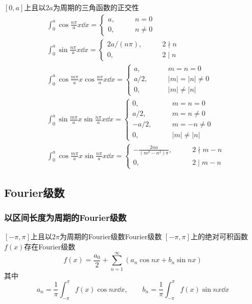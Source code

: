 \documentclass[lang = cn, scheme = chinese, thmcnt = section]{elegantbook}
\newcommand{\dis}{\displaystyle}
\begin{document}
\begin{theorem}{$[0,a]$上且以$2a$为周期的三角函数的正交性}
	\begin{align*}
		& \int_{0}^{a}\cos \frac{n\pi}{a}x\dd x=\begin{cases}
			a,\qquad & n=0\\
			0,\qquad & n\ne 0
		\end{cases}\\
		& \int_{0}^{a}\sin \frac{n\pi}{a}x\dd x=\begin{cases}
			2a/(n\pi),\qquad & 2\nmid n\\
			0,\qquad & 2\mid n
		\end{cases}\\
		& \int_{0}^{a}\cos \frac{m\pi}{a}x\cos \frac{n\pi}{a}x \dd x=\begin{cases}
			a,\qquad & m=n=0\\
			a/2,\qquad & |m|=|n|\ne 0\\
			0,\qquad & |m|\ne |n|
		\end{cases}\\
		& \int_{0}^{a}\sin \frac{m\pi}{a}x\sin \frac{n\pi}{a}x \dd x=\begin{cases}
			0,\qquad & m=n=0\\
			a/2,\qquad & m=n\ne 0\\
			-a/2,\qquad & m=-n\ne 0\\
			0,\qquad & |m|\ne |n|
		\end{cases}\\
		& \int_{0}^{a}\cos \frac{m\pi}{a}x\sin \frac{n\pi}{a}x\dd x=\begin{cases}
			\dis-\frac{2na}{(m^2-n^2)\pi},\qquad & 2\nmid m-n\\
			0,\qquad & 2\mid m-n
		\end{cases}
	\end{align*}
\end{theorem}

\subsection{Fourier级数}

\subsubsection{以区间长度为周期的Fourier级数}

\begin{theorem}{$[-\pi,\pi]$上且以$2\pi$为周期的Fourier级数}{Fourier级数}
	$[-\pi,\pi]$上的绝对可积函数$f(x)$存在Fourier级数%
	$$
	f(x)=\frac{a_0}{2}+\sum_{n=1}^{\infty}(a_n\cos nx+b_n\sin nx)
	$$
	其中%
	$$
	a_n=\frac{1}{\pi}\int_{-\pi}^{\pi}f(x)\cos n x\dd x,\qquad 
	b_n=\frac{1}{\pi}\int_{-\pi}^{\pi}f(x)\sin n x\dd x
	$$
\end{theorem}
\end{document}
